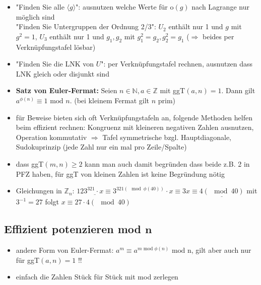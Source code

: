 \documentclass[10pt,a4paper]{article}
\begin{document}
\begin{itemize}
\item "Finden Sie alle $\langle g \rangle$": ausnutzen welche Werte für o$(g)$ nach Lagrange nur möglich sind \\
"Finden Sie Untergruppen der Ordnung 2/3": $U_{2}$ enthält nur 1 und $g$ mit $g^{2}=1$, $U_{3}$ enthält nur 1 und $g_{1},g_{2}$ mit $g_{1}^{2}=g_{2},g_{2}^{2}=g_{1}$ ($\Rightarrow$  beides per Verknüpfungstafel lösbar)
\item "Finden Sie die LNK von $U$": per Verknüpfungstafel rechnen, ausnutzen dass LNK gleich oder disjunkt sind
\item \textbf{Satz von Euler-Fermat:} Seien $n\in \mathbb{N}, a\in \mathbb{Z}$ mit ggT$(a,n)=1$. Dann gilt $a^{\phi(n)}\equiv 1 \text{ mod } n$. (bei kleinem Fermat gilt $n$ prim)
\item für Beweise bieten sich oft Verknüpfungstafeln an, folgende Methoden helfen beim effizient rechnen: Kongruenz mit kleineren negativen Zahlen ausnutzen, Operation kommutativ $\Rightarrow$ Tafel symmetrische bzgl. Hauptdiagonale, Sudokuprinzip (jede Zahl nur ein mal pro Zeile/Spalte)
\item dass ggT$(m,n)\geq 2$ kann man auch damit begründen dass beide z.B. 2 in PFZ haben, für ggT von kleinen Zahlen ist keine Begründung nötig
\item Gleichungen in $\mathbb{Z}_{n}$: $\underline{123^{321}\cdot x\equiv}  3^{321(\mod \phi(40))}\cdot x\equiv 3x \equiv \underline{ 4 (\mod 40)}$ mit $3^{-1}=27$ folgt $x\equiv 27\cdot 4 (\mod 40) $
\end{itemize}



\subsection{Effizient potenzieren mod $\boldsymbol{n}$}
\begin{itemize}


\item andere Form von Euler-Fermat: $a^{m} \equiv a^{m \text { mod } \phi (n)} \text{ mod n}$, gilt aber auch nur für ggT$(a,n)=1$ !!
\item einfach die Zahlen Stück für Stück mit mod zerlegen
\end{itemize}
\end{document}
